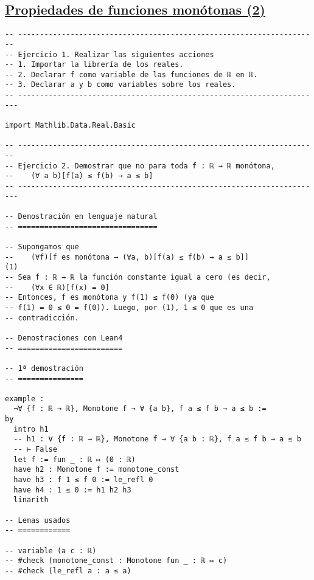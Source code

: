 \subsection{\href{./src/Logica/Propiedades\_de\_funciones\_monotonas\_2.lean}{Propiedades de funciones monótonas (2)}}
\label{sec:org27bb0db}
\begin{verbatim}
-- ---------------------------------------------------------------------
-- Ejercicio 1. Realizar las siguientes acciones
-- 1. Importar la librería de los reales.
-- 2. Declarar f como variable de las funciones de ℝ en ℝ.
-- 3. Declarar a y b como variables sobre los reales.
-- ----------------------------------------------------------------------

import Mathlib.Data.Real.Basic

-- ---------------------------------------------------------------------
-- Ejercicio 2. Demostrar que no para toda f : ℝ → ℝ monótona,
--    (∀ a b)[f(a) ≤ f(b) → a ≤ b]
-- ----------------------------------------------------------------------

-- Demostración en lenguaje natural
-- ================================

-- Supongamos que
--    (∀f)[f es monótona → (∀a, b)[f(a) ≤ f(b) → a ≤ b]]             (1)
-- Sea f : ℝ → ℝ la función constante igual a cero (es decir,
--    (∀x ∈ ℝ)[f(x) = 0]
-- Entonces, f es monótona y f(1) ≤ f(0) (ya que
-- f(1) = 0 ≤ 0 = f(0)). Luego, por (1), 1 ≤ 0 que es una
-- contradicción.

-- Demostraciones con Lean4
-- ========================

-- 1ª demostración
-- ===============

example :
  ¬∀ {f : ℝ → ℝ}, Monotone f → ∀ {a b}, f a ≤ f b → a ≤ b :=
by
  intro h1
  -- h1 : ∀ {f : ℝ → ℝ}, Monotone f → ∀ {a b : ℝ}, f a ≤ f b → a ≤ b
  -- ⊢ False
  let f := fun _ : ℝ ↦ (0 : ℝ)
  have h2 : Monotone f := monotone_const
  have h3 : f 1 ≤ f 0 := le_refl 0
  have h4 : 1 ≤ 0 := h1 h2 h3
  linarith

-- Lemas usados
-- ============

-- variable (a c : ℝ)
-- #check (monotone_const : Monotone fun _ : ℝ ↦ c)
-- #check (le_refl a : a ≤ a)
\end{verbatim}

